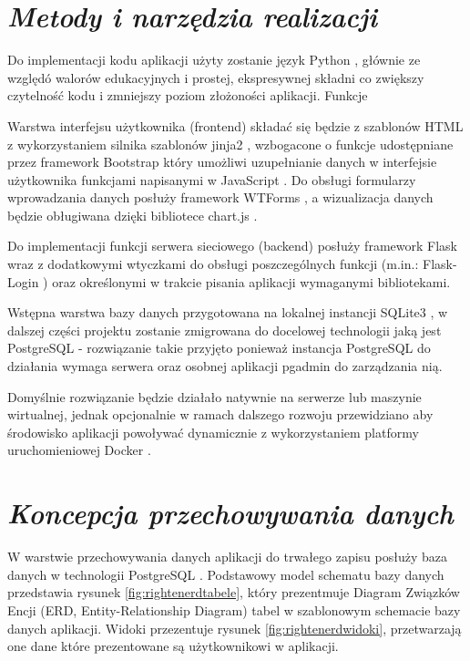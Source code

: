 \documentclass[a4paper,10pt, twoside]{report}
\newcommand{\customstylesection}[1]{\textbf{\textit{#1}}}
\begin{document}
\begin{large}
\section{\customstylesection{Metody i narzędzia realizacji}}
{Do implementacji kodu aplikacji użyty zostanie język Python \cite{Python}, 
głównie ze względó walorów edukacyjnych i prostej, ekspresywnej składni co 
zwiększy czytelność kodu i zmniejszy poziom złożoności aplikacji. Funkcje }

{Warstwa interfejsu użytkownika (frontend) składać się będzie z szablonów HTML z
 wykorzystaniem silnika szablonów jinja2 \cite{jinja}, wzbogacone o funkcje 
udostępniane przez framework Bootstrap \cite{Bootstrap} który umożliwi 
uzupełnianie danych w interfejsie użytkownika funkcjami napisanymi w 
JavaScript \cite{JavaScript}. Do obsługi formularzy wprowadzania danych posłuży 
framework WTForms \cite{WTForms}, a wizualizacja danych będzie obługiwana dzięki
 bibliotece chart.js \cite{chart.js}.}

{Do implementacji funkcji serwera sieciowego (backend) posłuży framework
 Flask \cite{Flask} wraz z dodatkowymi wtyczkami do obsługi poszczególnych 
funkcji (m.in.: Flask-Login \cite{Flask-Login}) oraz określonymi w trakcie 
pisania aplikacji wymaganymi bibliotekami.}

{Wstępna warstwa bazy danych przygotowana na lokalnej instancji 
SQLite3 \cite{SQLite}, w dalszej części projektu zostanie zmigrowana do 
docelowej technologii jaką jest PostgreSQL \cite{PostgreSQL} - rozwiązanie takie
 przyjęto ponieważ instancja PostgreSQL do działania wymaga serwera oraz osobnej
 aplikacji pgadmin \cite{pgAdmin} do zarządzania nią.}

{Domyślnie rozwiązanie będzie działało natywnie na serwerze lub maszynie 
wirtualnej, jednak opcjonalnie w ramach dalszego rozwoju przewidziano aby 
środowisko aplikacji powoływać dynamicznie z wykorzystaniem platformy 
uruchomieniowej Docker \cite{Docker}.}

\section{\customstylesection{Koncepcja przechowywania danych}}
{W warstwie przechowywania danych aplikacji do trwałego zapisu posłuży baza 
danych w technologii PostgreSQL \cite{PostgreSQL}. Podstawowy model schematu 
bazy danych przedstawia rysunek \ref{fig:rightenerdtabele}, który prezentmuje Diagram 
Związków Encji (ERD, Entity-Relationship Diagram) tabel w szablonowym schemacie bazy 
danych aplikacji. Widoki przezentuje rysunek \ref{fig:rightenerdwidoki}, 
przetwarzają one dane które prezentowane są użytkownikowi w aplikacji.}


\end{large}
\end{document}
